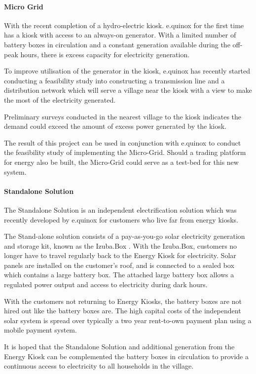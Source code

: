\documentclass{article}
\begin{document}
\paragraph{Micro Grid}
With the recent completion of a hydro-electric kiosk. e.quinox for the first time has a kiosk with access to an always-on generator. With a limited number of battery boxes in circulation and a constant generation available during the off-peak hours, there is excess capacity for electricity generation.

To improve utilisation of the generator in the kiosk, e.quinox has recently started conducting a feasibility study into constructing a transmission line and a distribution network which will serve a village near the kiosk with a view to make the most of the electricity generated.

Preliminary surveys conducted in the nearest village to the kiosk indicates the demand could exceed the amount of excess power generated by the kiosk. 

The result of this project can be used in conjunction with e.quinox to conduct the feasibility study of implementing the Micro-Grid. Should a trading platform for energy also be built, the Micro-Grid could serve as a test-bed for this new system.

\paragraph{Standalone Solution}
The Standalone Solution is an independent electrification solution which was recently developed by e.quinox for customers who live far from energy kiosks.

The Stand-alone solution consists of a pay-as-you-go solar electricity generation and storage kit, known as the Izuba.Box \cite{e.quinox-Standalone-web:2012}.  With the Izuba.Box, customers no longer have to travel regularly back to the Energy Kiosk for electricity. Solar panels are installed on the customer’s roof, and is connected to a sealed box which contains a large battery box. The attached large battery box allows a regulated power output and access to electricity during dark hours. 

With the customers not returning to Energy Kiosks, the battery boxes are not hired out like the battery boxes are. The high capital costs of the independent solar system is spread over typically a two year rent-to-own payment plan using a mobile payment system.

It is hoped that the Standalone Solution and additional generation from the Energy Kiosk can be complemented the battery boxes in circulation to provide a continuous access to electricity to all households in the village.
\end{document}
